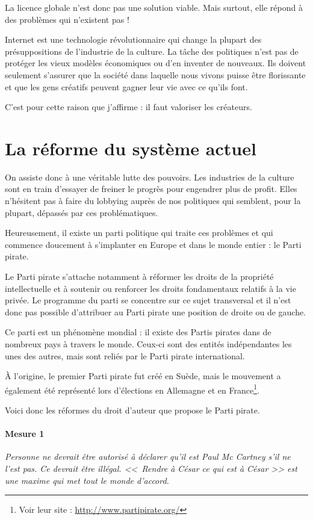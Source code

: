 La licence globale n'est donc pas une solution viable.
Mais surtout, elle répond à des problèmes qui n'existent pas !

Internet est une technologie révolutionnaire qui change la plupart des présuppositions de l'industrie de la culture.
La tâche des politiques n'est pas de protéger les vieux modèles économiques ou d'en inventer de nouveaux.
Ils doivent seulement s'assurer que la société dans laquelle nous vivons puisse être florissante et que les gens créatifs peuvent gagner leur vie avec ce qu'ils font.

C'est pour cette raison que j'affirme : il faut valoriser les créateurs.

\section{La réforme du système actuel}

On assiste donc à une véritable lutte des pouvoirs.
Les industries de la culture sont en train d'essayer de freiner le progrès pour engendrer plus de profit.
Elles n'hésitent pas à faire du lobbying auprès de nos politiques qui semblent, pour la plupart, dépassés par ces problématiques.

Heureusement, il existe un parti politique qui traite ces problèmes et qui commence doucement à s'implanter en Europe et dans le monde entier : le Parti pirate.

Le Parti pirate s'attache notamment à réformer les droits de la propriété intellectuelle et à soutenir ou renforcer les droits fondamentaux relatifs à la vie privée.
Le programme du parti se concentre sur ce sujet transversal et il n'est donc pas possible d'attribuer au Parti pirate une position de droite ou de gauche.

Ce parti est un phénomène mondial : il existe des Partis pirates dans de nombreux pays à travers le monde.
Ceux-ci sont des entités indépendantes les unes des autres, mais sont reliés par le Parti pirate international.

À l'origine, le premier Parti pirate fut créé en Suède, mais le mouvement a également été représenté lors d'élections en Allemagne et en France\footnote{Voir leur site : \url{http://www.partipirate.org/}}.

Voici donc les réformes du droit d'auteur que propose le Parti pirate.

\paragraph{Mesure 1}
\textit{Personne ne devrait être autorisé à déclarer qu'il est Paul Mc Cartney s'il ne l'est pas.
Ce devrait être illégal.
<<~Rendre à César ce qui est à César >> est une maxime qui met tout le monde d'accord.}


